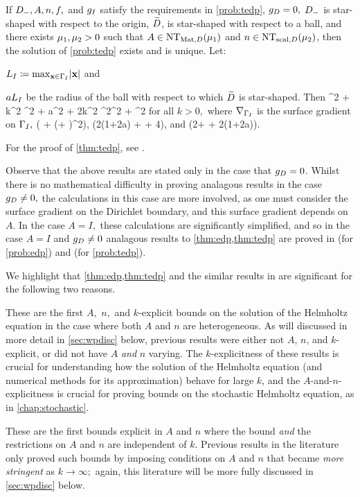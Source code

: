 \label{thm:tedp}
If $D_{-}, A, n, f,$ and $g_{I}$ satisfy the requirements in \cref{prob:tedp}, $g_{D} = 0,$ $D_{-}$ is star-shaped with respect to the origin, $\widetilde{D}$, is star-shaped with respect to a ball, and there exists $\mu_{1}, \mu_{2} > 0$ such that $A \in \NTAD{\muo}$ and $n \in \NTnD{\mut}$, then the solution of \cref{prob:tedp} exists and is unique. Let:
\bit
\item $\LI \de \max_{\bx \in \GI} \abs{\bx}$ and
\item $aL_{I}$ be the radius of the ball with respect to which $\widetilde{D}$ is star-shaped.
    \eit
Then
\beqs
  \muo {}^2 + \mut k^2 ^2 + a\LI{}^2 + 2\LI k^2 ^2\leq \Ct {}^2 + \Cttilde \NLtGI{\gI}^2
\eeqs
for all $k>0,$ where $\nabla_{\Gamma_{I}}$ is the surface gradient on $\Gamma_{I},$
\beqs
\Ct {}\mleft( + \mleft(\beta + \mright)^2\mright),
\eeqs
\beqs
\Cttilde {}\mleft(2\mleft(1+\frac2a\mright) + \frac\beta{\LI} + 4\mright)\LI,
\eeqs
and
\beqs
\beta \de \LI \mleft(2+ + 2\mleft(1+\frac2a\mright)\mright).
\eeqs
\enth

For the proof of \cref{thm:tedp}, see \cite[Theorem A.6 (i)]{GrPeSp:19}.

Observe that the above results are stated only in the case that $g_{D} = 0$. Whilst there is no mathematical difficulty in proving analagous results in the case $g_{D} \neq 0,$ the calculations in this case are more involved, as one must consider the surface gradient on the Dirichlet boundary, and this surface gradient depends on $A.$ In the case $A=I,$ these calculations are significantly simplified, and so in the case $A=I$ and $g_{D} \neq 0$ analagous results to \cref{thm:edp,thm:tedp} are proved in \cite[Theorem 2.19(ii)]{GrPeSp:19} (for \cref{prob:edp}) and \cite[Theorem A.6(iv)]{GrPeSp:19} (for \cref{prob:tedp}).

We highlight that \cref{thm:edp,thm:tedp} and the similar results in \cite{GrPeSp:19} are significant for the following two reasons.
\ben
\item These are the first $A,$ $n,$ and $k$-explicit bounds on the solution of the Helmholtz equation in the case where both $A$ and $n$ are heterogeneous. As will discussed in more detail in \cref{sec:wpdisc} below, previous results were either not $A$, $n$, and $k$-explicit, or did not have $A$ \emph{and} $n$ varying. The $k$-explicitness of these results is crucial for understanding how the solution of the Helmholtz equation (and numerical methods for its approximation) behave for large $k$, and the $A$-and-$n$-explicitness is crucial for proving bounds on the stochastic Helmholtz equation, as in \cref{chap:stochastic}.
  \item These are the first bounds explicit in $A$ and $n$ where the bound \emph{and} the restrictions on $A$ and $n$ are independent of $k.$ Previous results in the literature only proved such bounds by imposing conditions on $A$ and $n$ that became \emph{more stringent} as $k \rightarrow \infty;$ again, this literature will be more fully discussed in \cref{sec:wpdisc} below.
\een


